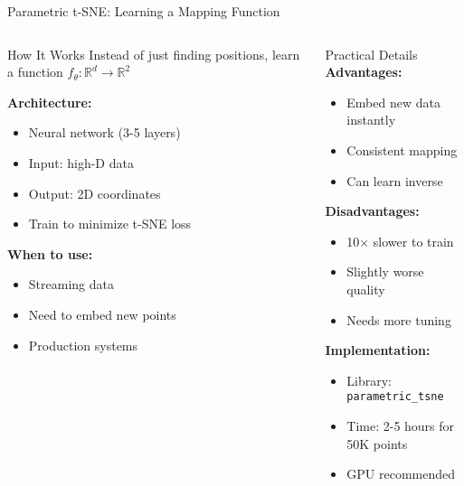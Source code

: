 \documentclass[aspectratio=169]{beamer}
\begin{document}
\begin{frame}{Parametric t-SNE: Learning a Mapping Function}
\begin{columns}
\begin{block}{How It Works}
Instead of just finding positions, learn a function $f_\theta: \mathbb{R}^d \to \mathbb{R}^2$

\textbf{Architecture:}
\begin{itemize}
\item Neural network (3-5 layers)
\item Input: high-D data
\item Output: 2D coordinates
\item Train to minimize t-SNE loss
\end{itemize}

\textbf{When to use:}
\begin{itemize}
\item Streaming data
\item Need to embed new points
\item Production systems
\end{itemize}
\end{block}

\begin{block}{Practical Details}
\textbf{Advantages:}
\begin{itemize}
\item Embed new data instantly
\item Consistent mapping
\item Can learn inverse
\end{itemize}

\textbf{Disadvantages:}
\begin{itemize}
\item 10× slower to train
\item Slightly worse quality
\item Needs more tuning
\end{itemize}

\textbf{Implementation:}
\begin{itemize}
\item Library: \texttt{parametric\_tsne}
\item Time: 2-5 hours for 50K points
\item GPU recommended
\end{itemize}
\end{block}
\end{columns}
\end{frame}
\end{document}
